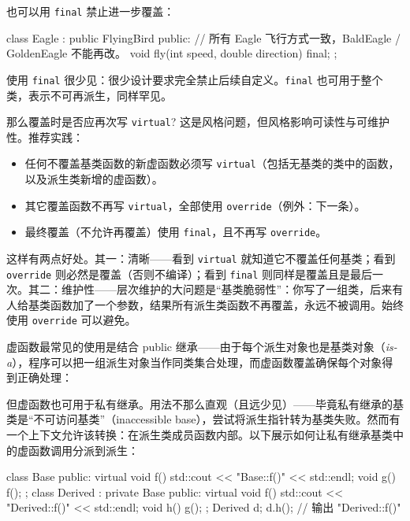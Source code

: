 也可以用 \texttt{final} 禁止进一步覆盖：

\begin{code}
class Eagle : public FlyingBird {
  public:
  // 所有 Eagle 飞行方式一致，BaldEagle / GoldenEagle 不能再改。
  void fly(int speed, double direction) final;
};
\end{code}

使用 \texttt{final} 很少见：很少设计要求完全禁止后续自定义。\texttt{final} 也可用于整个类，表示不可再派生，同样罕见。

那么覆盖时是否应再次写 \texttt{virtual}? 这是风格问题，但风格影响可读性与可维护性。推荐实践：

\begin{itemize}
\item 任何不覆盖基类函数的新虚函数必须写 \texttt{virtual}（包括无基类的类中的函数，以及派生类新增的虚函数）。
\item 其它覆盖函数不再写 \texttt{virtual}，全部使用 \texttt{override}（例外：下一条）。
\item 最终覆盖（不允许再覆盖）使用 \texttt{final}，且不再写 \texttt{override}。
\end{itemize}

这样有两点好处。其一：清晰——看到 \texttt{virtual} 就知道它不覆盖任何基类；看到 \texttt{override} 则必然是覆盖（否则不编译）；看到 \texttt{final} 则同样是覆盖且是最后一次。其二：维护性——层次维护的大问题是“基类脆弱性”：你写了一组类，后来有人给基类函数加了一个参数，结果所有派生类函数不再覆盖，永远不被调用。始终使用 \texttt{override} 可以避免。

虚函数最常见的使用是结合 public 继承——由于每个派生对象也是基类对象（\emph{is-a}），程序可以把一组派生对象当作同类集合处理，而虚函数覆盖确保每个对象得到正确处理：

\begin{code}
void MakeLoudBoom(std::vector<FlyingBird*> birds)
  for (auto bird : birds) {
    bird->fly(...);   // 同一调用，结果不同
  }
}
\end{code}

但虚函数也可用于私有继承。用法不那么直观（且远少见）——毕竟私有继承的基类是“不可访问基类”（inaccessible base），尝试将派生指针转为基类失败。然而有一个上下文允许该转换：在派生类成员函数内部。以下展示如何让私有继承基类中的虚函数调用分派到派生：

\begin{code}
class Base {
  public:
  virtual void f() {
      std::cout << "Base::f()" << std::endl;
    }
  void g() { f(); }
};
class Derived : private Base {
  public:
  virtual void f() {
    std::cout << "Derived::f()" << std::endl;
  }
  void h() { g(); }
};
Derived d;
d.h(); // 输出 "Derived::f()"
\end{code}


